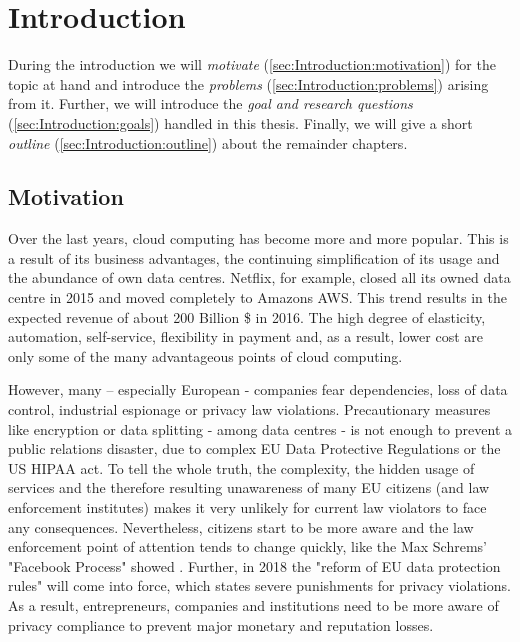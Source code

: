 
\chapter{Introduction}
\label{ch:Introduction}

During the introduction we will \textit{motivate} (\autoref{sec:Introduction:motivation}) for the topic at hand and introduce the \textit{problems} (\autoref{sec:Introduction:problems}) arising from it. Further, we will introduce the \textit{goal and research questions} (\autoref{sec:Introduction:goals}) handled in this thesis. Finally, we will give a short \textit{outline} (\autoref{sec:Introduction:outline}) about the remainder chapters.


\section{Motivation}
\label{sec:Introduction:motivation}

Over the last years, cloud computing has become more and more popular. This is a result of its business advantages, the continuing simplification of its usage and the abundance of own data centres. Netflix, for example, closed all its owned data centre in 2015 and moved completely to Amazons AWS\cite{DavidChernicoff.2015}. This trend results in the expected revenue of about 200 Billion \$ in 2016\cite{statista.com.2016}. The high degree of elasticity, automation, self-service, flexibility in payment and, as a result, lower cost are only some of the many advantageous points of cloud computing.\cite{Binz.2014}

However, many – especially European - companies fear dependencies, loss of data control, industrial espionage or privacy law violations. Precautionary measures like encryption or data splitting - among data centres - is not enough to prevent a public relations disaster, due to complex EU Data Protective Regulations\cite{personaldata.2011} or the US HIPAA act\cite{OfficeforCivilRights.20130726}. To tell the whole truth, the complexity, the hidden usage of services and the therefore resulting unawareness of many EU citizens (and law enforcement institutes) makes it very unlikely for current law violators to face any consequences. Nevertheless, citizens start to be more aware and the law enforcement point of attention tends to change quickly, like the Max Schrems' "Facebook Process" showed \cite{JuliaBahr.20150923}. Further, in 2018 the "reform of EU data protection rules" will come into force, which states severe punishments for privacy violations\cite{personaldata.2011}. As a result, entrepreneurs, companies and institutions need to be more aware of privacy compliance to prevent major monetary and reputation losses. 

